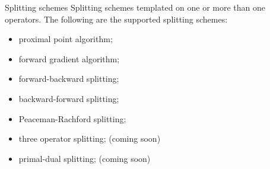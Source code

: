 \documentclass[hyperref,handout,compress,9pt,mathserif]{beamer}
\begin{document}
\begin{frame}{Splitting schemes}
Splitting schemes templated on one or more than one operators. The following are the supported splitting schemes:
\begin{itemize}
\item proximal point algorithm;
\item forward gradient algorithm;
\item forward-backward splitting;
\item backward-forward splitting;
\item Peaceman-Rachford splitting;
\item three operator splitting; (coming soon)
\item primal-dual splitting; (coming soon)
\end{itemize}
\end{frame}
\end{document}
